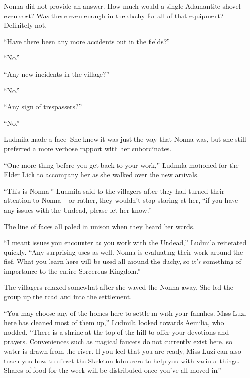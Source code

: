  

Nonna did not provide an answer. How much would a single Adamantite shovel even cost? Was there even enough in the duchy for all of that equipment? Definitely not.

 

“Have there been any more accidents out in the fields?”

 

“No.”

 

“Any new incidents in the village?”

 

“No.”

 

“Any sign of trespassers?”

 

“No.”

 

Ludmila made a face. She knew it was just the way that Nonna was, but she still preferred a more verbose rapport with her subordinates.

 

“One more thing before you get back to your work,” Ludmila motioned for the Elder Lich to accompany her as she walked over the new arrivals.

 

“This is Nonna,” Ludmila said to the villagers after they had turned their attention to Nonna – or rather, they wouldn’t stop staring at her, “if you have any issues with the Undead, please let her know.”

 

The line of faces all paled in unison when they heard her words.

 

“I meant issues you encounter as you work with the Undead,” Ludmila reiterated quickly. “Any surprising uses as well. Nonna is evaluating their work around the fief. What you learn here will be used all around the duchy, so it’s something of importance to the entire Sorcerous Kingdom.”

 

The villagers relaxed somewhat after she waved the Nonna away. She led the group up the road and into the settlement.

 

“You may choose any of the homes here to settle in with your families. Miss Luzi here has cleaned most of them up,” Ludmila looked towards Aemilia, who nodded. “There is a shrine at the top of the hill to offer your devotions and prayers. Conveniences such as magical faucets do not currently exist here, so water is drawn from the river. If you feel that you are ready, Miss Luzi can also teach you how to direct the Skeleton labourers to help you with various things. Shares of food for the week will be distributed once you’ve all moved in.”

